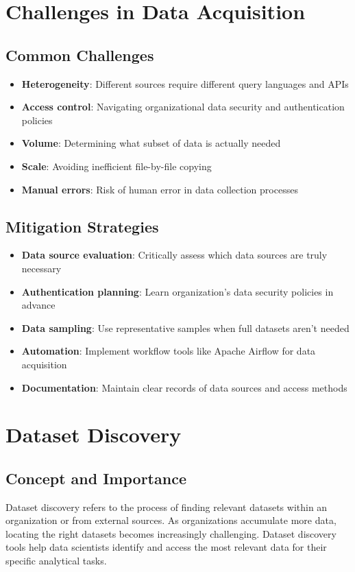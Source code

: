 \documentclass[12pt]{article}
\begin{document}
\section{Challenges in Data Acquisition}

\subsection{Common Challenges}
\begin{itemize}
    \item \textbf{Heterogeneity}: Different sources require different query languages and APIs
    \item \textbf{Access control}: Navigating organizational data security and authentication policies
    \item \textbf{Volume}: Determining what subset of data is actually needed
    \item \textbf{Scale}: Avoiding inefficient file-by-file copying
    \item \textbf{Manual errors}: Risk of human error in data collection processes
\end{itemize}

\subsection{Mitigation Strategies}
\begin{itemize}
    \item \textbf{Data source evaluation}: Critically assess which data sources are truly necessary
    \item \textbf{Authentication planning}: Learn organization's data security policies in advance
    \item \textbf{Data sampling}: Use representative samples when full datasets aren't needed
    \item \textbf{Automation}: Implement workflow tools like Apache Airflow for data acquisition
    \item \textbf{Documentation}: Maintain clear records of data sources and access methods
\end{itemize}

\section{Dataset Discovery}

\subsection{Concept and Importance}
\begin{tcolorbox}[colback=yellow!5!white,colframe=yellow!75!black,title=Dataset Discovery]
Dataset discovery refers to the process of finding relevant datasets within an organization or from external sources. As organizations accumulate more data, locating the right datasets becomes increasingly challenging. Dataset discovery tools help data scientists identify and access the most relevant data for their specific analytical tasks.
\end{tcolorbox}
\end{document}
